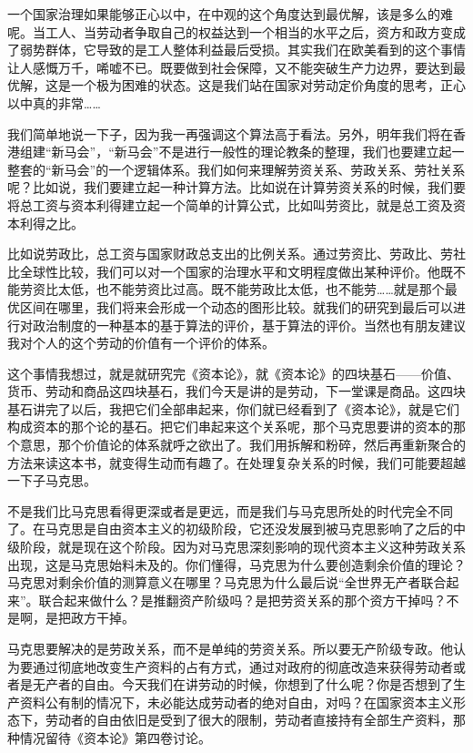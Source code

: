 \documentclass[UTF8, 12pt, a4paper]{ctexrep}
\begin{document}
一个国家治理如果能够正心以中，在中观的这个角度达到最优解，该是多么的难呢。当工人、当劳动者争取自己的权益达到一个相当的水平之后，资方和政方变成了弱势群体，它导致的是工人整体利益最后受损。其实我们在欧美看到的这个事情让人感慨万千，唏嘘不已。既要做到社会保障，又不能突破生产力边界，要达到最优解，这是一个极为困难的状态。这是我们站在国家对劳动定价角度的思考，正心以中真的非常……

我们简单地说一下子，因为我一再强调这个算法高于看法。另外，明年我们将在香港组建“新马会”，“新马会”不是进行一般性的理论教条的整理，我们也要建立起一整套的“新马会”的一个逻辑体系。我们如何来理解劳资关系、劳政关系、劳社关系呢？比如说，我们要建立起一种计算方法。比如说在计算劳资关系的时候，我们要将总工资与资本利得建立起一个简单的计算公式，比如叫劳资比，就是总工资及资本利得之比。

比如说劳政比，总工资与国家财政总支出的比例关系。通过劳资比、劳政比、劳社比全球性比较，我们可以对一个国家的治理水平和文明程度做出某种评价。他既不能劳资比太低，也不能劳资比过高。既不能劳政比太低，也不能劳……就是那个最优区间在哪里，我们将来会形成一个动态的图形比较。就我们的研究到最后可以进行对政治制度的一种基本的基于算法的评价，基于算法的评价。当然也有朋友建议我对个人的这个劳动的价值有一个评价的体系。

这个事情我想过，就是就研究完《资本论》，就《资本论》的四块基石——价值、货币、劳动和商品这四块基石，我们今天是讲的是劳动，下一堂课是商品。这四块基石讲完了以后，我把它们全部串起来，你们就已经看到了《资本论》，就是它们构成资本的那个论的基石。把它们串起来这个关系呢，那个马克思要讲的资本的那个意思，那个价值论的体系就呼之欲出了。我们用拆解和粉碎，然后再重新聚合的方法来读这本书，就变得生动而有趣了。在处理复杂关系的时候，我们可能要超越一下子马克思。

不是我们比马克思看得更深或者是更远，而是我们与马克思所处的时代完全不同了。在马克思是自由资本主义的初级阶段，它还没发展到被马克思影响了之后的中级阶段，就是现在这个阶段。因为对马克思深刻影响的现代资本主义这种劳政关系出现，这是马克思始料未及的。你们懂得，马克思为什么要创造剩余价值的理论？马克思对剩余价值的测算意义在哪里？马克思为什么最后说“全世界无产者联合起来”。联合起来做什么？是推翻资产阶级吗？是把劳资关系的那个资方干掉吗？不是啊，是把政方干掉。

马克思要解决的是劳政关系，而不是单纯的劳资关系。所以要无产阶级专政。他认为要通过彻底地改变生产资料的占有方式，通过对政府的彻底改造来获得劳动者或者是无产者的自由。今天我们在讲劳动的时候，你想到了什么呢？你是否想到了生产资料公有制的情况下，未必能达成劳动者的绝对自由，对吗？在国家资本主义形态下，劳动者的自由依旧是受到了很大的限制，劳动者直接持有全部生产资料，那种情况留待《资本论》第四卷讨论。
\end{document}
